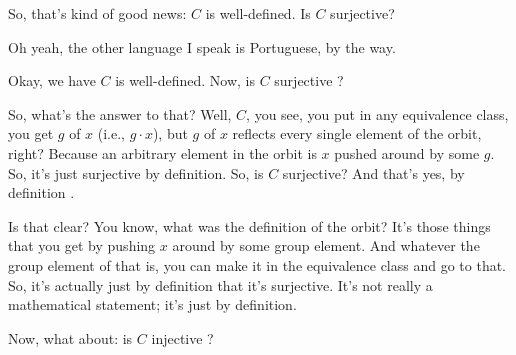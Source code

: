 \begin{speech}[00:28:45 - 00:30:04]
So, that's kind of good news: $C$ is well-defined. Is $C$ surjective? 

Oh yeah, the other language I speak is Portuguese, by the way.

Okay, we have $C$ is well-defined. Now, is $C$ surjective ?

So, what's the answer to that? Well, $C$, you see, you put in any equivalence class, you get $g$ of $x$ (i.e., $g \cdot x$), but $g$ of $x$ reflects every single element of the orbit, right? Because an arbitrary element in the orbit is $x$ pushed around by some $g$. So, it's just surjective by definition. So, is $C$ surjective? And that's yes, by definition .

Is that clear? You know, what was the definition of the orbit? It's those things that you get by pushing $x$ around by some group element. And whatever the group element of that is, you can make it in the equivalence class and go to that. So, it's actually just by definition that it's surjective. It's not really a mathematical statement; it's just by definition.
\end{speech}

\begin{content}

\end{content}

\begin{speech}[00:30:04 - 00:30:08]
Now, what about: is $C$ injective ?
\end{speech}

\begin{content}
\end{content}

